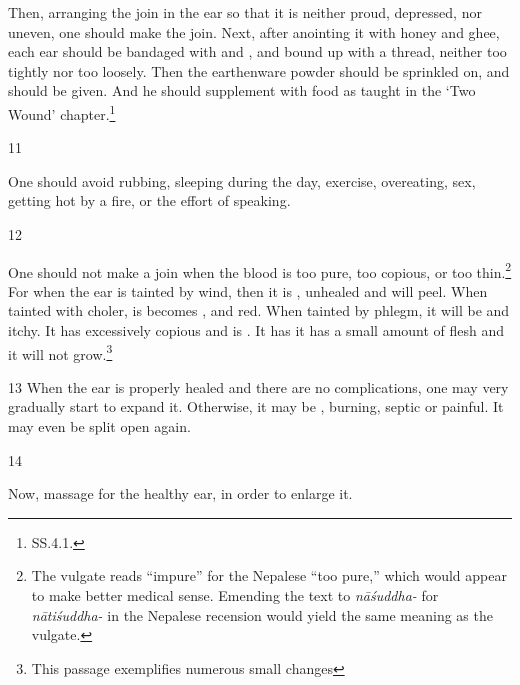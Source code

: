 \begin{translation}
    
    Then, arranging the join in the ear so that it is neither proud, depressed, nor
    uneven, one should make the join. Next, after anointing it with honey and ghee,
    each ear should be bandaged with  and , and
    bound up with a thread, neither too tightly nor too loosely.  Then the earthenware
    powder should be sprinkled on, and  should be given.
    And he should supplement with food as taught in  the `Two Wound'
    chapter.\footnote{SS.4.1.}
    
    \item[11]
    \begin{sloka}
        One should avoid rubbing, sleeping during the day, exercise, overeating,
        sex, getting hot by a fire, or the effort of speaking.
    \end{sloka}
    
    \item[12]
    
    One should not make a join when the blood is too pure, too copious, or too
    thin.\footnote{The vulgate reads “impure” for the Nepalese “too pure,” which would
    appear to make better medical sense.  Emending the text to \emph{nāśuddha-} for
    \emph{nātiśuddha-} in the Nepalese recension would yield the same meaning as the
    vulgate.} For when the ear is tainted by wind, then it is
    , unhealed and will peel. When tainted with
    choler, is becomes ,  and red.  When tainted
    by phlegm, it will be  and itchy.  It has excessively copious
     and is .  It has it has a small
    amount of  flesh and it will not grow.\footnote{This passage
    exemplifies numerous small changes }
    
    \item[13] When the ear is properly healed and there are no complications,  one may
    very gradually start to expand it.  Otherwise, it may be ,
    burning, septic or painful.  It may even be split open again.
    
    
    \item [14]
    
    
    Now, massage for the healthy ear, in order to enlarge it. 
    
    \newcommand{\animal}[4]{#1 (\emph{#2}\footnote{#3 (#4)})}
    \newcommand{\plant}[4]{#1 (\emph{#2}\footnote{#3 (#4)})}
    

\end{translation}
